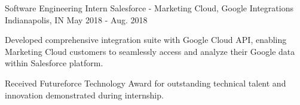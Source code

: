 \begin{cventries}
  \cventry
    {Software Engineering Intern}
    {Salesforce - Marketing Cloud, Google Integrations}
    {Indianapolis, IN}
    {May 2018 - Aug. 2018}
    {
      \begin{cvitems}
        \item {Developed comprehensive integration suite with Google Cloud API, enabling Marketing Cloud customers to seamlessly access and analyze their Google data within Salesforce platform.}
        \item {Received Futureforce Technology Award for outstanding technical talent and innovation demonstrated during internship.}
      \end{cvitems}
    }
\end{cventries}